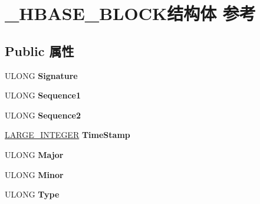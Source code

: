 \hypertarget{struct___h_b_a_s_e___b_l_o_c_k}{}\section{\+\_\+\+H\+B\+A\+S\+E\+\_\+\+B\+L\+O\+C\+K结构体 参考}
\label{struct___h_b_a_s_e___b_l_o_c_k}
\subsection*{Public 属性}
\begin{DoxyCompactItemize}
\item 
\mbox{\label{struct___h_b_a_s_e___b_l_o_c_k_a92f66215c251d07ba14cc0e908c1bfd2}} 
U\+L\+O\+NG {\bfseries Signature}
\item 
\mbox{\label{struct___h_b_a_s_e___b_l_o_c_k_a312bf3d034144a7ef6362e93fcdc8721}} 
U\+L\+O\+NG {\bfseries Sequence1}
\item 
\mbox{\label{struct___h_b_a_s_e___b_l_o_c_k_af56ecd0478ef53cb7bde829456d448e0}} 
U\+L\+O\+NG {\bfseries Sequence2}
\item 
\mbox{\label{struct___h_b_a_s_e___b_l_o_c_k_a641aaf95e7c0c80575c73ef02aa90bf5}} 
\hyperlink{union___l_a_r_g_e___i_n_t_e_g_e_r}{L\+A\+R\+G\+E\+\_\+\+I\+N\+T\+E\+G\+ER} {\bfseries Time\+Stamp}
\item 
\mbox{\label{struct___h_b_a_s_e___b_l_o_c_k_a620379def282a45d2feba548a4306c39}} 
U\+L\+O\+NG {\bfseries Major}
\item 
\mbox{\label{struct___h_b_a_s_e___b_l_o_c_k_a58427c3c6b1400490b1b9018e886fdd3}} 
U\+L\+O\+NG {\bfseries Minor}
\item 
\mbox{\label{struct___h_b_a_s_e___b_l_o_c_k_a614733435bec09a597504f63d6f4127e}} 
U\+L\+O\+NG {\bfseries Type}
\item 
\mbox{\label{struct___h_b_a_s_e___b_l_o_c_k_a9bd1b56036752ac66207f4e6b8d31df6}} 

\end{DoxyCompactItemize}
